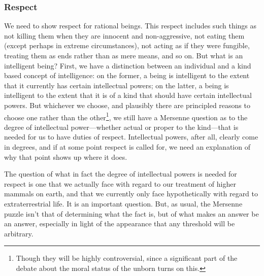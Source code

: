 \subsubsection{Respect}
We need to show respect for rational beings. This respect includes such things as not killing them when they are
innocent and non-aggressive, not eating them (except perhaps in extreme circumstances), not acting as if they were fungible, treating them as ends rather than as
mere means, and so on. But what is an intelligent being? First, we have a distinction between an individual and a kind based
concept of intelligence: on the former, a being is intelligent to the extent that it currently has certain intellectual powers;
on the latter, a being is intelligent to the extent that it is of a kind that should have certain intellectual powers. But whichever we choose, and
plausibly there are principled reasons to choose one rather than the other\footnote{Though they will be highly controversial, since 
a significant part of the debate about the moral status of the unborn turns on this.}, 
we still have a Mersenne question as to the degree of intellectual power---whether actual or proper to the kind---that is 
needed for us to have duties of respect. Intellectual powers, after all, clearly come in degrees, and if at some point respect
is called for, we need an explanation of why that point shows up where it does.

The question of what in fact the degree of intellectual powers is needed for respect is one that we actually face with regard to our treatment
of higher mammals on earth, and that we currently only face hypothetically with regard to extraterrestrial life. 
It is an important question. But, as usual, the Mersenne puzzle isn't that of determining what the fact is, but of what makes 
an answer be an answer, especially in light of the appearance that any threshold will be arbitrary.

